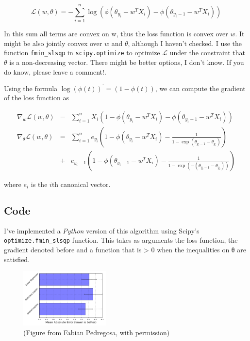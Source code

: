 \begin{equation}
  \mathcal{L}(w, \theta) = - \sum_{i=1}^n \log(\phi(\theta_{y_i} - w^T X_i) -  \phi(\theta_{y_i -1} - w^T X_i))
\end{equation}


In this sum all terms are convex on w, thus the loss function is convex over $w$. It might be also jointly convex over $w$ and $\theta$, although I haven't checked. I use the function \lstinline{fmin_slsqp} in \texttt{scipy.optimize} to optimize $\mathcal{L}$ under the constraint that $\theta$ is a non-decreasing vector. There might be better options, I don't know. If you do know, please leave a comment!.

Using the formula $\log(\phi(t))^\prime = (1 - \phi(t))$, we can compute the gradient of the loss function as


\begin{eqnarray*}
    \nabla_w \mathcal{L}(w, \theta) &=& \sum_{i=1}^n X_i (1 - \phi(\theta_{y_i} - w^T X_i) - \phi(\theta_{y_i-1} - w^T X_i)) \\
    \nabla_\theta \mathcal{L}(w, \theta) &=& \sum_{i=1}^n e_{y_i} \left(1 - \phi(\theta_{y_i} - w^T X_i) - \frac{1}{1 - \exp(\theta_{y_i -1} - \theta_{y_i})}\right)  \\
        \qquad  &+& e_{y_i -1}\left(1 - \phi(\theta_{y_i -1} - w^T X_i) - \frac{1}{1 - \exp(- (\theta_{y_i-1} - \theta_{y_i}))}\right)
\end{eqnarray*}

where $e_i$ is the $i$th canonical vector.

\subsection{Code}

I've implemented a \emph{Python} version of this algorithm using Scipy's \lstinline{optimize.fmin_slsqp} function. This takes as arguments the loss function, the gradient denoted before and a function that is > 0 when the inequalities on θ are satisfied.

\begin{figure}
  \centering
  \includegraphics[width=0.4\textwidth]{../Images/ordinal_bars.png}
  \caption{(Figure from Fabian Pedregosa, with permission)}
\end{figure}


